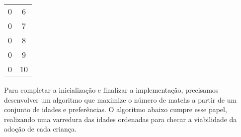 \documentclass[]{book}
\begin{document}
\begin{longtable}[]{@{}cc@{}}
\begin{minipage}[t]{0.33\columnwidth}
0
\strut\end{minipage} &
\begin{minipage}[t]{0.05\columnwidth}\centering\strut
6
\strut\end{minipage}\tabularnewline
\begin{minipage}[t]{0.33\columnwidth}\centering\strut
0
\strut\end{minipage} &
\begin{minipage}[t]{0.05\columnwidth}\centering\strut
7
\strut\end{minipage}\tabularnewline
\begin{minipage}[t]{0.33\columnwidth}\centering\strut
0
\strut\end{minipage} &
\begin{minipage}[t]{0.05\columnwidth}\centering\strut
8
\strut\end{minipage}\tabularnewline
\begin{minipage}[t]{0.33\columnwidth}\centering\strut
0
\strut\end{minipage} &
\begin{minipage}[t]{0.05\columnwidth}\centering\strut
9
\strut\end{minipage}\tabularnewline
\begin{minipage}[t]{0.33\columnwidth}\centering\strut
0
\strut\end{minipage} &
\begin{minipage}[t]{0.05\columnwidth}\centering\strut
10
\strut\end{minipage}\tabularnewline
\bottomrule
\end{longtable}

Para completar a inicialização e finalizar a implementação, precisamos
desenvolver um algoritmo que maximize o número de matchs a partir de um
conjunto de idades e preferências. O algoritmo abaixo cumpre esse papel,
realizando uma varredura das idades ordenadas para checar a viabilidade
da adoção de cada criança.
\end{document}
